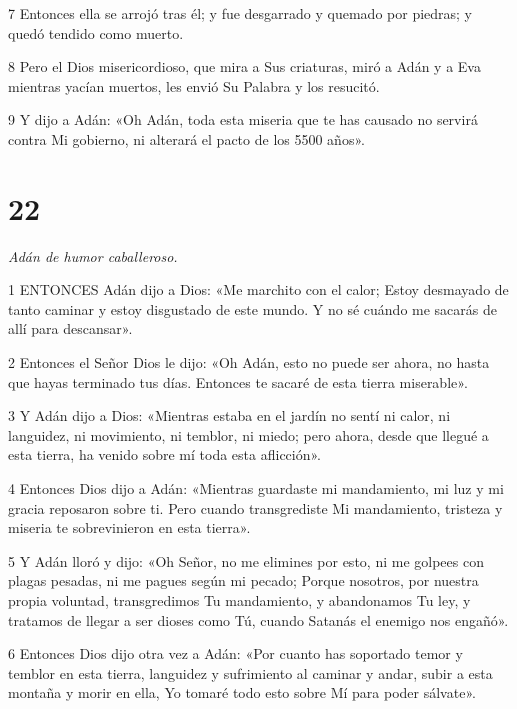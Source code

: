 \par 7 Entonces ella se arrojó tras él; y fue desgarrado y quemado por piedras; y quedó tendido como muerto.

\par 8 Pero el Dios misericordioso, que mira a Sus criaturas, miró a Adán y a Eva mientras yacían muertos, les envió Su Palabra y los resucitó.

\par 9 Y dijo a Adán: «Oh Adán, toda esta miseria que te has causado no servirá contra Mi gobierno, ni alterará el pacto de los 5500 años».

\chapter{22}

\par \textit{Adán de humor caballeroso.}

\par 1 ENTONCES Adán dijo a Dios: «Me marchito con el calor; Estoy desmayado de tanto caminar y estoy disgustado de este mundo. Y no sé cuándo me sacarás de allí para descansar».

\par 2 Entonces el Señor Dios le dijo: «Oh Adán, esto no puede ser ahora, no hasta que hayas terminado tus días. Entonces te sacaré de esta tierra miserable».

\par 3 Y Adán dijo a Dios: «Mientras estaba en el jardín no sentí ni calor, ni languidez, ni movimiento, ni temblor, ni miedo; pero ahora, desde que llegué a esta tierra, ha venido sobre mí toda esta aflicción».

\par 4 Entonces Dios dijo a Adán: «Mientras guardaste mi mandamiento, mi luz y mi gracia reposaron sobre ti. Pero cuando transgrediste Mi mandamiento, tristeza y miseria te sobrevinieron en esta tierra».

\par 5 Y Adán lloró y dijo: «Oh Señor, no me elimines por esto, ni me golpees con plagas pesadas, ni me pagues según mi pecado; Porque nosotros, por nuestra propia voluntad, transgredimos Tu mandamiento, y abandonamos Tu ley, y tratamos de llegar a ser dioses como Tú, cuando Satanás el enemigo nos engañó».

\par 6 Entonces Dios dijo otra vez a Adán: «Por cuanto has soportado temor y temblor en esta tierra, languidez y sufrimiento al caminar y andar, subir a esta montaña y morir en ella, Yo tomaré todo esto sobre Mí para poder sálvate».

